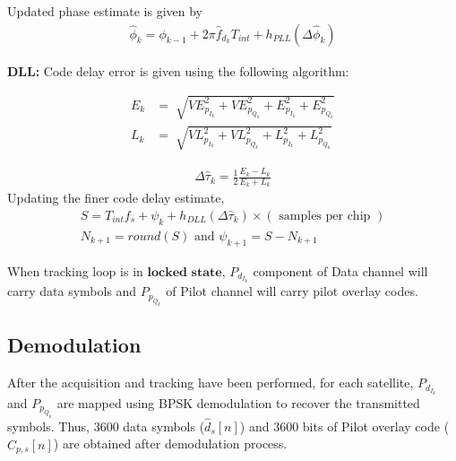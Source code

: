 \documentclass[conference]{IEEEtran}
\begin{document}
\noindent Updated phase estimate is given by
\begin{align}
	\hat{\phi}_k = \phi_{k-1} + 2\pi \hat{f}_{d_{k}}T_{int} + h_{PLL}(\Delta \hat{\phi}_k)
\end{align}

\noindent\textbf{DLL:}
Code delay error is given using the following algorithm:

\begin{align}
	E_k &= \sqrt[]{VE_{p_{I_{k}}}^2+VE_{p_{Q_{k}}}^2+E_{p_{I_{k}}}^2 + E_{p_{Q_{k}}}^2}    \\
	L_k &= \sqrt[]{VL_{p_{I_{k}}}^2+VL_{p_{Q_{k}}}^2+L_{p_{I_{k}}}^2 + L_{p_{Q_{k}}}^2} 
\end{align}

\begin{align}
	\Delta \hat{\tau}_k = \frac{1}{2}\frac{E_k-L_k}{E_k+L_k}
\end{align}
Updating the finer code delay estimate, 
\begin{multline}
	S = T_{int} f_s + \psi_k + h_{DLL}(\Delta \hat{\tau}_k )\times(\text{ samples per chip })\\
	N_{k+1} = round (S) \text{  and  } \psi_{k+1} = S - N_{k+1}
\end{multline}


\noindent When tracking loop is in $\textbf{locked state}$,  $P_{d_{I_{k}}}$ component of Data channel will 
carry data symbols and $P_{p_{Q_{k}}}$ of Pilot channel will carry pilot overlay codes.

\subsection{Demodulation}
After the acquisition and tracking have been performed, for each satellite, $P_{d_{I_{k}}}$ and $P_{p_{Q_{k}}}$ are 
mapped using BPSK demodulation to recover the transmitted symbols. Thus, 3600 data symbols ($\hat{d}_s[n]$) and 3600 bits of Pilot
overlay code ($\hat{C}_{p,s}[n]$) are obtained after demodulation process.
\end{document}
